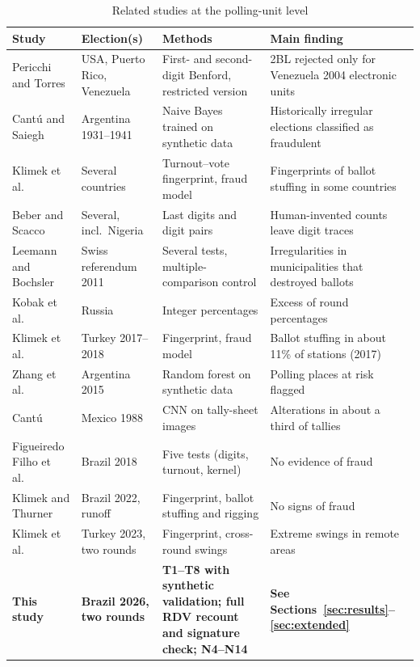 \documentclass[fleqn,10pt]{SelfArx}
\begin{document}
\begin{table}[ht]
\caption{Related studies at the polling-unit level}
\label{tab:related}
\centering\small
\begin{tabular}{@{}L{3.3cm} L{3.0cm} L{4.6cm} L{5.0cm}@{}}
\toprule
\textbf{Study} & \textbf{Election(s)} & \textbf{Methods} & \textbf{Main finding} \\
\midrule
Pericchi and Torres \cite{pericchi2011} & USA, Puerto Rico, Venezuela & First- and second-digit Benford, restricted version & 2BL rejected only for Venezuela 2004 electronic units \\
Cant\'u and Saiegh \cite{cantu2011} & Argentina 1931--1941 & Naive Bayes trained on synthetic data & Historically irregular elections classified as fraudulent \\
Klimek et al.\ \cite{klimek2012} & Several countries & Turnout--vote fingerprint, fraud model & Fingerprints of ballot stuffing in some countries \\
Beber and Scacco \cite{beber2012} & Several, incl.\ Nigeria & Last digits and digit pairs & Human-invented counts leave digit traces \\
Leemann and Bochsler \cite{leemann2014} & Swiss referendum 2011 & Several tests, multiple-comparison control & Irregularities in municipalities that destroyed ballots \\
Kobak et al.\ \cite{kobak2016} & Russia & Integer percentages & Excess of round percentages \\
Klimek et al.\ \cite{klimek2018} & Turkey 2017--2018 & Fingerprint, fraud model & Ballot stuffing in about 11\% of stations (2017) \\
Zhang et al.\ \cite{zhang2019} & Argentina 2015 & Random forest on synthetic data & Polling places at risk flagged \\
Cant\'u \cite{cantu2019} & Mexico 1988 & CNN on tally-sheet images & Alterations in about a third of tallies \\
Figueiredo Filho et al.\ \cite{figueiredo2022} & Brazil 2018 & Five tests (digits, turnout, kernel) & No evidence of fraud \\
Klimek and Thurner \cite{csh2022} & Brazil 2022, runoff & Fingerprint, ballot stuffing and rigging & No signs of fraud \\
Klimek et al.\ \cite{klimek2023} & Turkey 2023, two rounds & Fingerprint, cross-round swings & Extreme swings in remote areas \\
\textbf{This study} & \textbf{Brazil 2026, two rounds} & \textbf{T1--T8 with synthetic validation; full RDV recount and signature check; N4--N14} & \textbf{See Sections~\ref{sec:results}--\ref{sec:extended}} \\
\bottomrule
\end{tabular}
\end{table}
\end{document}
